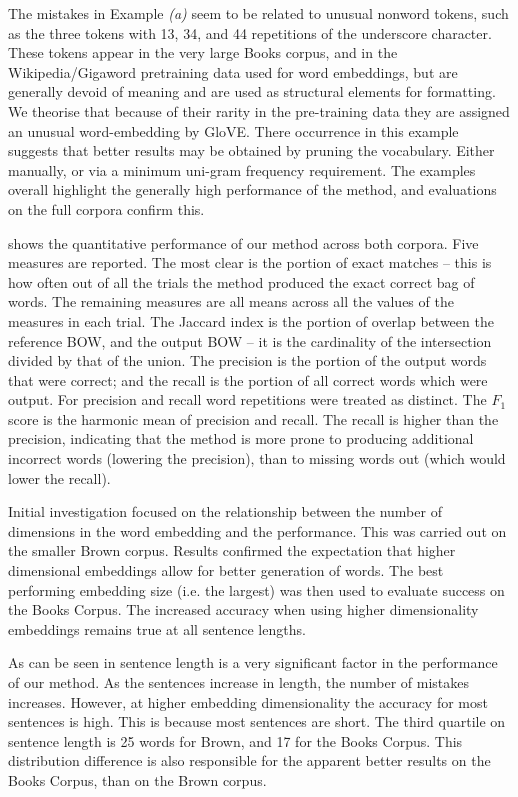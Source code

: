 \documentclass{llncs}
\begin{document}
The mistakes in Example \emph{(a)} seem to be related to unusual nonword tokens, such as the three tokens with 13, 34, and 44 repetitions of the underscore character. These tokens appear in the very large Books corpus, and in the Wikipedia/Gigaword pretraining data used for word embeddings, but are generally devoid of meaning and are used as structural elements for formatting. We theorise that because of their rarity in the pre-training data they are assigned an unusual word-embedding by GloVE. There occurrence in this example suggests that better results may be obtained by pruning the vocabulary. Either manually, or via a minimum uni-gram frequency requirement. The examples overall highlight the generally high performance of the method, and evaluations on the full corpora confirm this.

 shows the quantitative performance of our method across both corpora. Five measures are reported. The most clear is the portion of exact matches -- this is how often out of all the trials the method produced the exact correct bag of words. The remaining measures are all means across all the values of the measures in each trial.  The Jaccard index is the portion of overlap between the reference BOW, and the output BOW -- it is the cardinality of the intersection divided by that of the union. The precision is the portion of the output words that were correct; and the recall is the portion of all correct words which were output. For precision and recall word repetitions were treated as distinct. The $F_1$ score is the harmonic mean of precision and recall. The recall is higher than the precision, indicating that the method is more prone to producing additional incorrect words (lowering the precision), than to missing words out (which would lower the recall). 

Initial investigation focused on the relationship between the number of dimensions in the word embedding and the performance. This was carried out on the smaller Brown corpus. Results confirmed the expectation that higher dimensional embeddings allow for better generation of words. The best performing embedding size (i.e. the largest)  was then used to evaluate success on the Books Corpus. The increased accuracy when using higher dimensionality embeddings remains true at all sentence lengths.

As can be seen in  sentence length is a very significant factor in the performance of our method. As the sentences increase in length, the number of mistakes increases. However, at higher embedding dimensionality the accuracy for most sentences is high. This is because most sentences are short. The third quartile on sentence length is 25 words for Brown, and 17 for the Books Corpus. This distribution difference is also responsible for the apparent better results on the Books Corpus, than on the Brown corpus.
\end{document}
